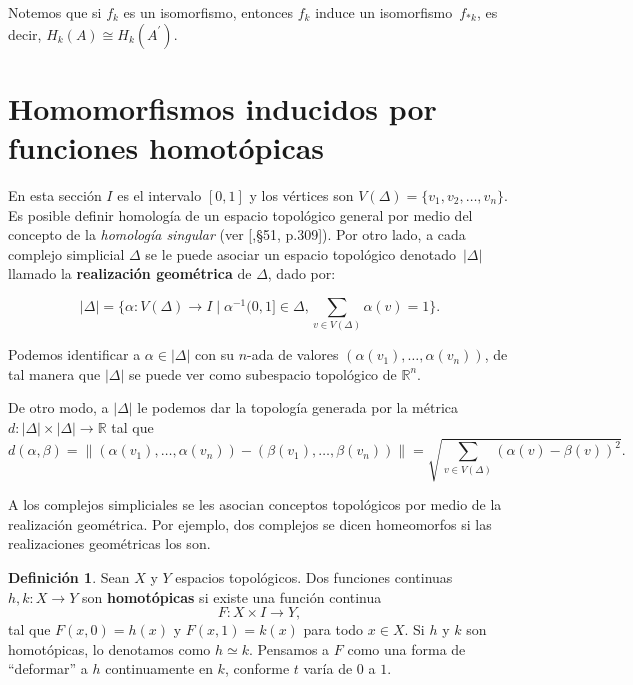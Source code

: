 \documentclass[12pt]{book}
\newtheorem{theorem}{Teorema}[section]
\theoremstyle{definition}
\newtheorem{definition}[theorem]{Definición}
\newcounter{in}
\newcounter{ini}
\begin{document}
Notemos que si $f_{k}$ es un isomorfismo, entonces $f_{k}$ induce un
isomorfismo~$f_{*k}$, es decir, $H_{k}(A)\cong H_{k}(A^{'})$.

\section[Homomorfismos inducidos]{Homomorfismos inducidos por funciones homotópicas}
\label{hom-ind}

En esta sección $I$ es el intervalo $[0,1]$ y los vértices son
$V(\Delta)=\{v_{1},v_{2},\dots,v_{n}\}$. Es posible definir homología
de un espacio topológico general por medio del concepto de la
\emph{homología singular} (ver [\cite{munkres1984elements},\S 51,
p.309]). Por otro lado, a cada complejo simplicial $\Delta$ se le
puede asociar un espacio topológico denotado~$|\Delta|$ llamado la
\textbf{realización geométrica} de $\Delta$, dado por:

$$|\Delta|=\{\alpha:V(\Delta)\rightarrow I\mid\alpha^{-1}(0,1]\in
\Delta, \sum _{v\in V(\Delta)}\alpha(v)=1\}.$$

Podemos identificar a $\alpha\in |\Delta|$ con su $n$-ada de valores
$(\alpha(v_{1}),\dots,\alpha(v_{n}))$, de tal manera que $|\Delta|$ se
puede ver como subespacio topológico de $\mathbb{R}^{n}$.

De otro modo, a $|\Delta|$ le podemos dar la topología generada por la
métrica $d:|\Delta|\times |\Delta|\rightarrow\mathbb{R}$ tal que
\begin{equation*}
  \label{metrica}
  d(\alpha,\beta)=\parallel
  (\alpha(v_{1}),\dots,\alpha(v_{n}))-(\beta(v_{1}),\dots,\beta(v_{n}))\parallel=\sqrt{\sum
    _{v\in V(\Delta)}(\alpha(v)-\beta(v))^{2}}.
\end{equation*}

A los complejos simpliciales se les asocian conceptos topológicos por
medio de la realización geométrica. Por ejemplo, dos complejos se
dicen homeomorfos si las realizaciones geométricas los son.
\begin{definition}
  Sean $X$ y $Y$ espacios topológicos. Dos funciones continuas
  $h,k:X\rightarrow Y$ son \textbf{homotópicas} si existe una función continua
  $$F:X\times I\rightarrow Y,$$
  tal que $F(x,0)=h(x)$ y $F(x,1)=k(x)$ para todo $x\in X.$ Si $h$ y
  $k$ son homotópicas, lo denotamos como $h\simeq k$. Pensamos a $F$
  como una forma de ``deformar'' a $h$ continuamente en $k$, conforme
  $t$ varía de $0$ a $1$.
\end{definition}

\end{document}
